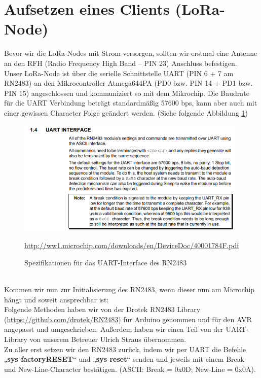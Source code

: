 \section{Aufsetzen eines Clients (LoRa-Node)} \label{mac-commands}
Bevor wir die LoRa-Nodes mit Strom versorgen, sollten wir erstmal eine Antenne an den RFH (Radio Frequency High Band – PIN 23) Anschluss befestigen.\\
Unser LoRa-Node ist über die serielle Schnittstelle UART (PIN 6 + 7 am RN2483) an den Mikrocontroller Atmega644PA (PD0 bzw. PIN 14 + PD1 bzw. PIN 15) angeschlossen und kommuniziert so mit dem Mikrochip. Die Baudrate für die UART Verbindung beträgt standardmäßig 57600 bps, kann aber auch mit einer gewissen Character Folge geändert werden. (Siehe folgende Abbildung \ref{fig:UART})
\begin{figure}[ht]
    \center
    \includegraphics[width=11cm]{Bilder/lora-8.png}\\
    \caption{Spezifikationen für das UART-Interface des RN2483}
    \begin{center} \quelle\url{http://ww1.microchip.com/downloads/en/DeviceDoc/40001784F.pdf} \end{center}
        \label{fig:UART}
\end{figure}\\
Kommen wir nun zur Initialisierung des RN2483, wenn dieser nun am Microchip hängt und soweit ansprechbar ist:\\

Folgende Methoden haben wir von der Drotek RN2483 Library (\url{https://github.com/drotek/RN2483}) für Arduino genommen und für den AVR angepasst und umgeschrieben. Außerdem haben wir einen Teil von der UART-Library von unserem Betreuer Ulrich Straus übernommen.\\

Zu aller erst setzen wir den RN2483 zurück, indem wir per UART die Befehle „\textbf{sys factoryRESET}“ und „\textbf{sys reset}“ senden und jeweils mit einem Break- und New-Line-Character bestätigen. (ASCII: Break = 0x0D; New-Line = 0x0A).\\

